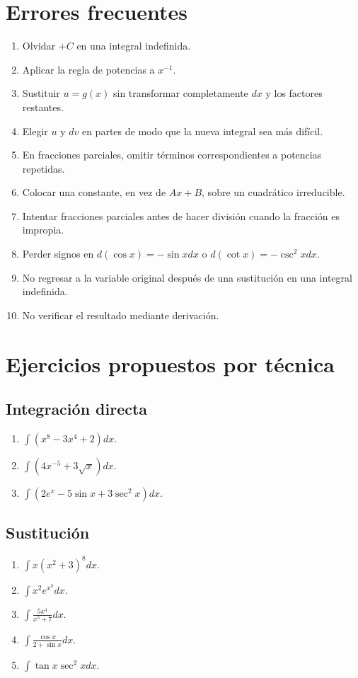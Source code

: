 \documentclass[12pt]{article}
\theoremstyle{definition}\newtheorem{definicion}[teorema]{Definición}\newtheorem{ejemplo}[teorema]{Ejemplo}\newtheorem{ejercicio}[teorema]{Ejercicio}
\theoremstyle{remark}\newtheorem*{observacion}{Observación}\newtheorem*{advertencia}{Advertencia}\newtheorem*{estrategia}{Estrategia}
\begin{document}
\section{Errores frecuentes}
\begin{enumerate}
\item Olvidar $+C$ en una integral indefinida.
\item Aplicar la regla de potencias a $x^{-1}$.
\item Sustituir $u=g(x)$ sin transformar completamente $dx$ y los factores restantes.
\item Elegir $u$ y $dv$ en partes de modo que la nueva integral sea más difícil.
\item En fracciones parciales, omitir términos correspondientes a potencias repetidas.
\item Colocar una constante, en vez de $Ax+B$, sobre un cuadrático irreducible.
\item Intentar fracciones parciales antes de hacer división cuando la fracción es impropia.
\item Perder signos en $d(\cos x)=-\sin xdx$ o $d(\cot x)=-\csc^2xdx$.
\item No regresar a la variable original después de una sustitución en una integral indefinida.
\item No verificar el resultado mediante derivación.
\end{enumerate}

\section{Ejercicios propuestos por técnica}
\subsection*{Integración directa}
\begin{enumerate}
\item $\int(x^8-3x^4+2)dx$.
\item $\int(4x^{-5}+3\sqrt{x})dx$.
\item $\int(2e^x-5\sin x+3\sec^2x)dx$.
\end{enumerate}
\subsection*{Sustitución}
\begin{enumerate}
\item $\int x(x^2+3)^8dx$.
\item $\int x^2e^{x^3}dx$.
\item $\int\frac{5x^4}{x^5+7}dx$.
\item $\int\frac{\cos x}{2+\sin x}dx$.
\item $\int\tan x\sec^2x dx$.
\end{enumerate}
\end{document}
